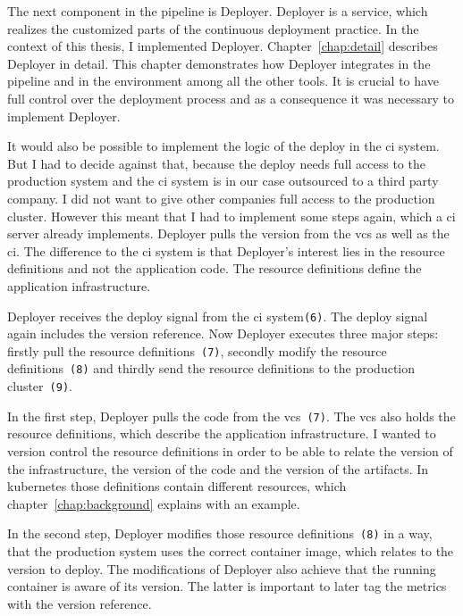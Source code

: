 The next component in the pipeline is Deployer. Deployer is a service, which realizes the
customized parts of the continuous deployment practice. In the context of this thesis, I
implemented Deployer. Chapter~\ref{chap:detail} describes Deployer in detail. This chapter
demonstrates how Deployer integrates in the pipeline and in the environment among all the
other tools. It is crucial to have full control over the deployment process and as a
consequence it was necessary to implement Deployer.

It would also be possible to implement the logic of the deploy in the \gls{ci} system. But
I had to decide against that, because the deploy needs full access to the production
system and the \gls{ci} system is in our case outsourced to a third party company. I did
not want to give other companies full access to the production cluster. However this
meant that I had to implement some steps again, which a \gls{ci} server already
implements. Deployer pulls the version from the \gls{vcs} as well as the \gls{ci}. The
difference to the \gls{ci} system is that Deployer's interest lies in the resource
definitions and not the application code. The resource definitions define the application
infrastructure.

Deployer receives the deploy signal from the \gls{ci} system\texttt{(6)}. The deploy
signal again includes the version reference. Now Deployer executes three major steps:
firstly pull the resource definitions~\texttt{(7)}, secondly modify the resource
definitions~\texttt{(8)} and thirdly send the resource definitions to the production
cluster~\texttt{(9)}.

In the first step, Deployer pulls the code from the \gls{vcs}~\texttt{(7)}. The \gls{vcs}
also holds the resource definitions, which describe the application infrastructure. I
wanted to version control the resource definitions in order to be able to relate the
version of the infrastructure, the version of the code and the version of the
artifacts. In kubernetes those definitions contain different resources, which
chapter~\ref{chap:background} explains with an example.

In the second step, Deployer modifies those resource definitions~\texttt{(8)} in a way,
that the production system uses the correct container image, which relates to the version
to deploy. The modifications of Deployer also achieve that the running container is aware
of its version. The latter is important to later tag the metrics with the version
reference.

